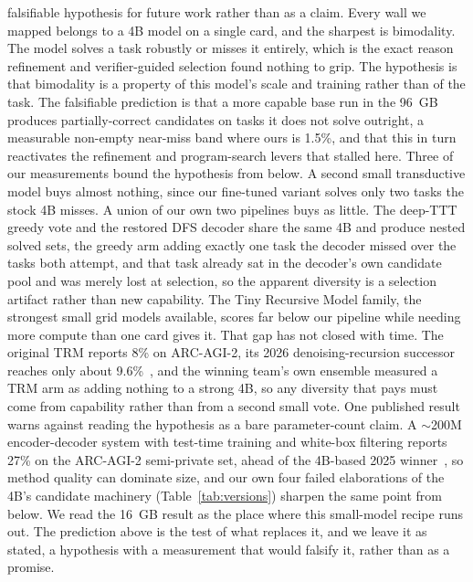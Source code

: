 \documentclass[11pt]{article}
\begin{document}
falsifiable hypothesis for future work rather than as a claim.
Every wall we mapped belongs to a 4B model on a single card, and the sharpest is bimodality. The model
solves a task robustly or misses it entirely, which is the exact reason refinement and verifier-guided
selection found nothing to grip. The hypothesis is that bimodality is a property of this model's scale
and training rather than of the task. The falsifiable prediction is that a more capable base run in the
96~GB produces partially-correct candidates on tasks it does not solve outright, a measurable non-empty
near-miss band where ours is 1.5\%, and that this in turn reactivates the refinement and program-search
levers that stalled here. Three of our measurements bound the hypothesis from below. A second small
transductive model buys almost nothing, since our fine-tuned variant solves only two tasks the stock 4B
misses. A union of our own two pipelines buys as little. The deep-TTT greedy vote and the restored DFS
decoder share the same 4B and produce nested solved sets, the greedy arm adding exactly one task the
decoder missed over the tasks both attempt, and that task already sat in the decoder's own candidate pool
and was merely lost at selection, so the apparent diversity is a selection artifact rather than new
capability. The Tiny Recursive Model family, the strongest small grid models available, scores far below
our pipeline while needing more compute than one card gives it. That gap has not closed with time. The
original TRM reports 8\% on ARC-AGI-2, its 2026 denoising-recursion successor reaches only about
9.6\%~\cite{arc2025}, and the winning team's own ensemble measured a TRM arm as adding nothing to a strong
4B, so any diversity that pays must come from capability rather than from a second small vote. One published result warns against reading the
hypothesis as a bare parameter-count claim. A $\sim$200M encoder-decoder system with test-time training
and white-box filtering reports 27\% on the ARC-AGI-2 semi-private set, ahead of the 4B-based 2025
winner~\cite{longt5arc}, so method quality can dominate size, and our own four failed elaborations of
the 4B's candidate machinery (Table~\ref{tab:versions}) sharpen the same point from below. We read the
16~GB result as the place where this small-model recipe runs out. The prediction above is the test of
what replaces it, and we leave it as stated, a hypothesis with a measurement that would falsify it,
rather than as a promise.
\end{document}
